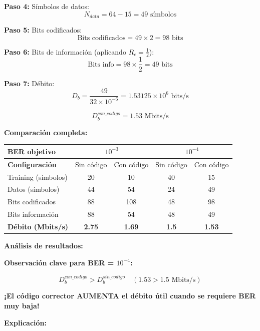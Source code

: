 \documentclass[11pt,a4paper]{article}
\begin{document}
\textbf{Paso 4:} S\'imbolos de datos:
\[
N_{data} = 64 - 15 = 49 \text{ s\'imbolos}
\]

\textbf{Paso 5:} Bits codificados:
\[
\text{Bits codificados} = 49 \times 2 = 98 \text{ bits}
\]

\textbf{Paso 6:} Bits de informaci\'on (aplicando $R_c = \frac{1}{2}$):
\[
\text{Bits info} = 98 \times \frac{1}{2} = 49 \text{ bits}
\]

\textbf{Paso 7:} D\'ebito:
\[
D_b = \frac{49}{32 \times 10^{-6}} = 1.53125 \times 10^{6} \text{ bits/s}
\]

\[
\boxed{D_b^{con\_codigo} = 1.53 \text{ Mbits/s}}
\]

\textbf{Comparaci\'on completa:}

\begin{center}
\begin{tabular}{|l|c|c|c|c|}
\hline
\textbf{BER objetivo} & \multicolumn{2}{c|}{\textbf{$10^{-3}$}} & \multicolumn{2}{c|}{\textbf{$10^{-4}$}} \\
\hline
\textbf{Configuraci\'on} & Sin c\'odigo & Con c\'odigo & Sin c\'odigo & Con c\'odigo \\
\hline
Training (s\'imbolos) & 20 & 10 & 40 & 15 \\
Datos (s\'imbolos) & 44 & 54 & 24 & 49 \\
Bits codificados & 88 & 108 & 48 & 98 \\
Bits informaci\'on & 88 & 54 & 48 & 49 \\
\textbf{D\'ebito (Mbits/s)} & \textbf{2.75} & \textbf{1.69} & \textbf{1.5} & \textbf{1.53} \\
\hline
\end{tabular}
\end{center}

\textbf{An\'alisis de resultados:}

\textbf{Observaci\'on clave para BER = $10^{-4}$:}

\[
\boxed{D_b^{con\_codigo} > D_b^{sin\_codigo} \quad (1.53 > 1.5 \text{ Mbits/s})}
\]

\textbf{¡El c\'odigo corrector AUMENTA el d\'ebito \'util cuando se requiere BER muy baja!}

\textbf{Explicaci\'on:}
\end{document}
